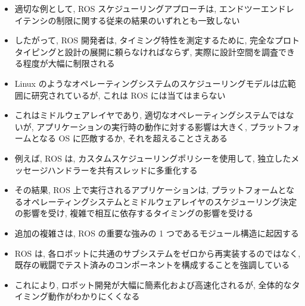 \begin{frame}{}
    \begin{itemize}
        \item 適切な例として, ROS スケジューリングアプローチは, エンドツーエンドレイテンシの制限に関する従来の結果のいずれとも一致しない
        \item したがって, ROS 開発者は, タイミング特性を測定するために, 完全なプロトタイピングと設計の展開に頼らなければならず, 実際に設計空間を調査できる程度が大幅に制限される
    \end{itemize}
\end{frame}


\begin{frame}{}
    \begin{itemize}
        \item Linux のようなオペレーティングシステムのスケジューリングモデルは広範囲に研究されているが, これは ROS には当てはまらない
        \item これはミドルウェアレイヤであり, 適切なオペレーティングシステムではないが, アプリケーションの実行時の動作に対する影響は大きく, プラットフォームとなる OS に匹敵するか, それを超えることさえある
        \item 例えば, ROS は, カスタムスケジューリングポリシーを使用して, 独立したメッセージハンドラーを共有スレッドに多重化する
        \item その結果, ROS 上で実行されるアプリケーションは, プラットフォームとなるオペレーティングシステムとミドルウェアレイヤのスケジューリング決定の影響を受け, 複雑で相互に依存するタイミングの影響を受ける
    \end{itemize}
\end{frame}

\begin{frame}{}
    \begin{itemize}
        \item 追加の複雑さは, ROS の重要な強みの 1 つであるモジュール構造に起因する
        \item ROS は, 各ロボットに共通のサブシステムをゼロから再実装するのではなく, 既存の戦闘でテスト済みのコンポーネントを構成することを強調している
        \item これにより, ロボット開発が大幅に簡素化および高速化されるが, 全体的なタイミング動作がわかりにくくなる
    \end{itemize}
\end{frame}

